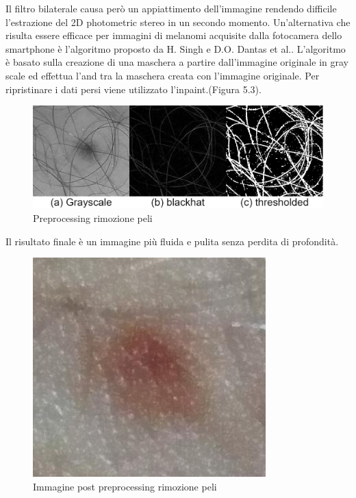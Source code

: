 {Il filtro bilaterale causa però un appiattimento dell'immagine \cite{tomasi1998bilateral} rendendo difficile l'estrazione del 2D photometric stereo in un secondo momento.
\newline
Un'alternativa che risulta essere efficace per immagini di melanomi acquisite dalla fotocamera dello smartphone è l'algoritmo proposto da H. Singh e D.O. Dantas et al.\cite{singh2019advanced, dantas2017blood}.
\newline
L'algoritmo è basato sulla creazione di una maschera a partire dall'immagine originale in gray scale ed effettua l'and tra la maschera creata con l'immagine originale.
Per ripristinare i dati persi viene utilizzato l'inpaint.(Figura 5.3).
\begin{figure}[h]
	\begin{center}
		\includegraphics[scale=0.4]{figure/capitolo6/border1.png}
	\end{center}
	\caption{Preprocessing rimozione peli}	
\end{figure}
Il risultato finale è un immagine più fluida e pulita senza perdita di profondità.
\newline
\begin{figure}[h]
	\begin{center}
		\includegraphics[scale=0.4]{figure/capitolo6/border2.jpg}
	\end{center}
	\caption{Immagine post preprocessing rimozione peli}	
\end{figure}
\newpage
}
